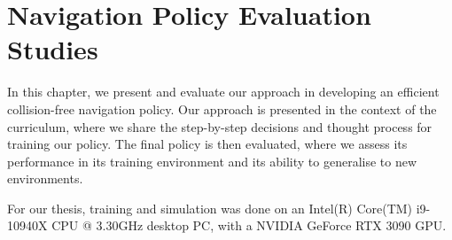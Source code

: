 \chapter{Navigation Policy Evaluation Studies}
\label{chap:7_navigation_policy_evaluation_studies}

In this chapter, we present and evaluate our approach in developing an efficient collision-free navigation policy. Our approach is presented in the context of the curriculum, where we share the step-by-step decisions and thought process for training our policy.
The final policy is then evaluated, where we assess its performance in its training environment and its ability to generalise to new environments.

For our thesis, training and simulation was done on an Intel(R) Core(TM) i9-10940X CPU @ 3.30GHz desktop PC, with a NVIDIA GeForce RTX 3090 GPU. 

